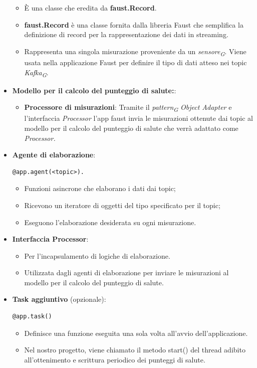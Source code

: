 \begin{itemize}
    \begin{itemize}
        \item È una classe che eredita da \textbf{faust.Record}.
        \item \textbf{faust.Record} è una classe fornita dalla libreria Faust che semplifica la definizione di record per la rappresentazione dei dati in streaming.
        \item Rappresenta una singola misurazione proveniente da un \textit{sensore}\textsubscript{\textit{G}}. Viene usata nella applicazione Faust per definire il tipo di dati atteso nei topic \textit{Kafka}\textsubscript{\textit{G}}.
    \end{itemize}
    \item \textbf{Modello per il calcolo del punteggio di salute:}:
    \begin{itemize}
        \item \textbf{Processore di misurazioni}: 
        Tramite il \textit{pattern}\textsubscript{\textit{G}} \textit{Object Adapter} e l'interfaccia \textit{Processor} l'app faust invia le misurazioni ottenute dai topic al modello per il calcolo del punteggio di salute che verrà adattato come \textit{Processor.}
    \end{itemize}
    \item \textbf{Agente di elaborazione}: 
    \begin{lstlisting}[style=code]
        @app.agent(<topic>).
    \end{lstlisting}  
    \begin{itemize}
        \item Funzioni asincrone che elaborano i dati dai topic;
        \item Ricevono un iteratore di oggetti del tipo specificato per il topic;
        \item Eseguono l'elaborazione desiderata su ogni misurazione.
    \end{itemize}
    \item \textbf{Interfaccia Processor}:
    \begin{itemize}
        \item Per l'incapsulamento di logiche di elaborazione.
        \item Utilizzata dagli agenti di elaborazione per inviare le misurazioni al modello per il calcolo del punteggio di salute.
    \end{itemize}
    \item \textbf{Task aggiuntivo} (opzionale): 
    \begin{lstlisting}[style=code]
    @app.task()
        \end{lstlisting}  
    \begin{itemize}
        \item Definisce una funzione eseguita una sola volta all'avvio dell'applicazione.
        \item Nel nostro progetto, viene chiamato il metodo start() del thread adibito all'ottenimento e scrittura periodico dei punteggi di salute.
    \end{itemize}
\end{itemize}

